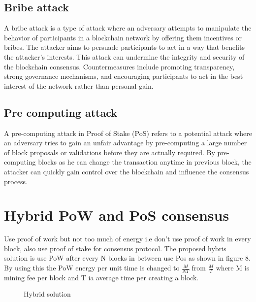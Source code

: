 \documentclass{article}
\begin{document}
\subsection{Bribe attack}
A bribe attack is a type of attack where an adversary attempts to manipulate the behavior of participants in a blockchain network by offering them incentives or bribes. The attacker aims to persuade participants to act in a way that benefits the attacker's interests. This attack can undermine the integrity and security of the blockchain consensus. Countermeasures include promoting transparency, strong governance mechanisms, and encouraging participants to act in the best interest of the network rather than personal gain.
\subsection{Pre computing attack}
A pre-computing attack in Proof of Stake (PoS) refers to a potential attack where an adversary tries to gain an unfair advantage by pre-computing a large number of block proposals or validations before they are actually required. By pre-computing blocks as he can change the transaction anytime in previous block, the attacker can quickly gain control over the blockchain and influence the consensus process.
\section{Hybrid PoW and PoS consensus}
Use proof of work but not too much of energy i.e don't use proof of work in every block, also use proof of stake for consensus protocol.
The proposed hybris solution is use PoW after every N blocks in between use Pos as shown in figure 8. \\
By using this the PoW energy per unit time is changed to $\frac{M}{NT}$ from $\frac{M}{T}$ where M is mining fee per block and T ia average time per creating a block.
\begin{figure}
\centering
  \caption{Hybrid solution}
\end{figure}
\end{document}
